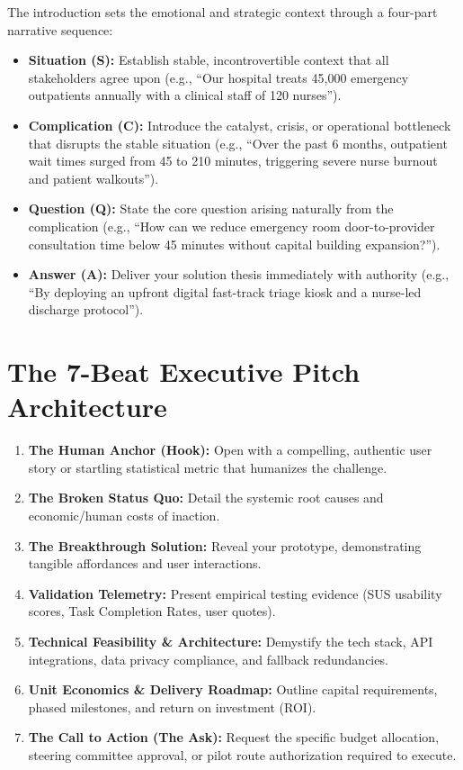 \begin{methodbox}
The introduction sets the emotional and strategic context through a four-part narrative sequence:
\begin{itemize}
    \item \textbf{Situation (S):} Establish stable, incontrovertible context that all stakeholders agree upon (e.g., ``Our hospital treats 45,000 emergency outpatients annually with a clinical staff of 120 nurses'').
    \item \textbf{Complication (C):} Introduce the catalyst, crisis, or operational bottleneck that disrupts the stable situation (e.g., ``Over the past 6 months, outpatient wait times surged from 45 to 210 minutes, triggering severe nurse burnout and patient walkouts'').
    \item \textbf{Question (Q):} State the core question arising naturally from the complication (e.g., ``How can we reduce emergency room door-to-provider consultation time below 45 minutes without capital building expansion?'').
    \item \textbf{Answer (A):} Deliver your solution thesis immediately with authority (e.g., ``By deploying an upfront digital fast-track triage kiosk and a nurse-led discharge protocol'').
\end{itemize}
\end{methodbox}

\section{The 7-Beat Executive Pitch Architecture}
\begin{enumerate}[label=\textbf{Beat \arabic*:}, leftmargin=2em]
    \item \textbf{The Human Anchor (Hook):} Open with a compelling, authentic user story or startling statistical metric that humanizes the challenge.
    \item \textbf{The Broken Status Quo:} Detail the systemic root causes and economic/human costs of inaction.
    \item \textbf{The Breakthrough Solution:} Reveal your prototype, demonstrating tangible affordances and user interactions.
    \item \textbf{Validation Telemetry:} Present empirical testing evidence (SUS usability scores, Task Completion Rates, user quotes).
    \item \textbf{Technical Feasibility \& Architecture:} Demystify the tech stack, API integrations, data privacy compliance, and fallback redundancies.
    \item \textbf{Unit Economics \& Delivery Roadmap:} Outline capital requirements, phased milestones, and return on investment (ROI).
    \item \textbf{The Call to Action (The Ask):} Request the specific budget allocation, steering committee approval, or pilot route authorization required to execute.
\end{enumerate}

